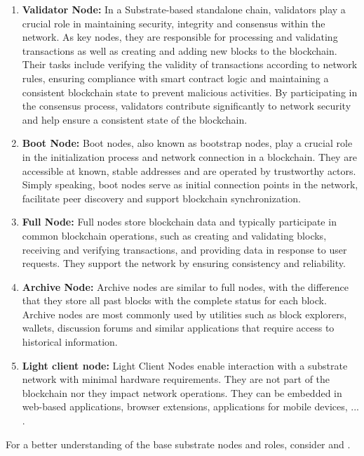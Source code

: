 \documentclass[]{article}
\begin{document}
\begin{enumerate}[label=\textbullet]
	\item\textbf{Validator Node:} 
    In a Substrate-based standalone chain, validators play a crucial role in maintaining security, integrity and consensus within the network. 
    As key nodes, they are responsible for processing and validating transactions as well as creating and adding new blocks to the blockchain. 
    Their tasks include verifying the validity of transactions according to network rules, ensuring compliance with smart contract logic and maintaining a consistent blockchain state to prevent malicious activities. 
    By participating in the consensus process, validators contribute significantly to network security and help ensure a consistent state of the blockchain. 

	\item\textbf{Boot Node:}
    Boot nodes, also known as bootstrap nodes, play a crucial role in the initialization process and network connection in a blockchain.
    They are accessible at known, stable addresses and are operated by trustworthy actors.	
	Simply speaking, boot nodes serve as initial connection points in the network, facilitate peer discovery and support blockchain synchronization.
	
	\item\textbf{Full Node:}
	Full nodes store blockchain data and typically participate in common blockchain operations, such as creating and validating blocks, receiving and verifying transactions, and providing data in response to user requests. 
	They support the network by ensuring consistency and reliability. 

	\item\textbf{Archive Node:} 
	Archive nodes are similar to full nodes, with the difference that they store all past blocks with the complete status for each block. 
	Archive nodes are most commonly used by utilities such as block explorers, wallets, discussion forums and similar applications that require access to historical information.     
	
	\item\textbf{Light client node:} 
    Light Client Nodes enable interaction with a substrate network with minimal hardware requirements. They are not part of the blockchain nor they impact network operations. 
    They can be embedded in web-based applications, browser extensions, applications for mobile devices, ... .      
\end{enumerate}
For a better understanding of the base substrate nodes and roles, consider \cite{SubstrateDoc-node} and \cite{SubstrateDoc-roles}.
\end{document}
